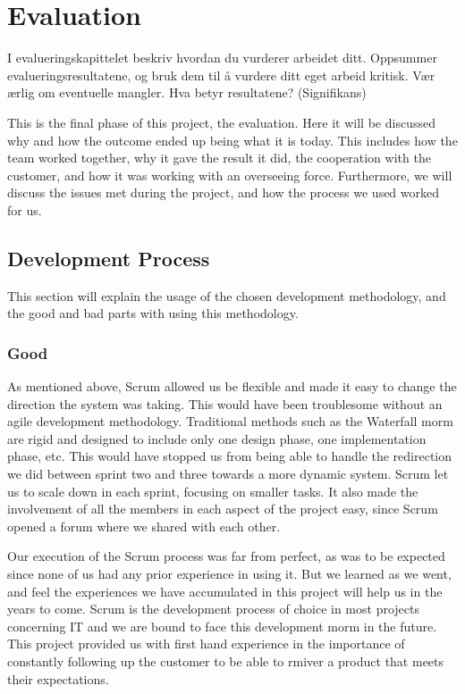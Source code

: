 \chapter{Evaluation}

\minitoc

I evalueringskapittelet beskriv hvordan du vurderer
arbeidet ditt. Oppsummer evalueringsresultatene, og
bruk dem til å vurdere ditt eget arbeid kritisk. Vær
ærlig om eventuelle mangler.
Hva betyr resultatene? (Signifikans)

This is the final phase of this project, the evaluation. Here it will be discussed why and how the outcome ended up being what it is today. This includes how the team worked together, why it gave the result it did, the cooperation with the customer, and how it was working with an overseeing force. Furthermore, we will discuss the issues met during the project, and how the process we used worked for us.

\clearpage


\section{Development Process}
This section will explain the usage of the chosen development methodology, and the good and bad parts with using this methodology.

\subsection*{Good}
As mentioned above, Scrum allowed us be flexible and made it easy to change the direction the system was taking. This would have been troublesome without an agile development methodology. Traditional methods such as the Waterfall morm are rigid and designed to include only one design phase, one implementation phase, etc. This would have stopped us from being able to handle the redirection we did between sprint two and three towards a more dynamic system. Scrum let us to scale down in each sprint, focusing on smaller tasks. It also made the involvement of all the members in each aspect of the project easy, since Scrum opened a forum where we shared with each other.

Our execution of the Scrum process was far from perfect, as was to be expected since none of us had any prior experience in using it. But we learned as we went, and feel the experiences we have accumulated in this project will help us in the years to come. Scrum is the development process of choice in most projects concerning IT and we are bound to face this development morm in the future. This project provided us with first hand experience in the importance of constantly following up the customer to be able to rmiver a product that meets their expectations.


